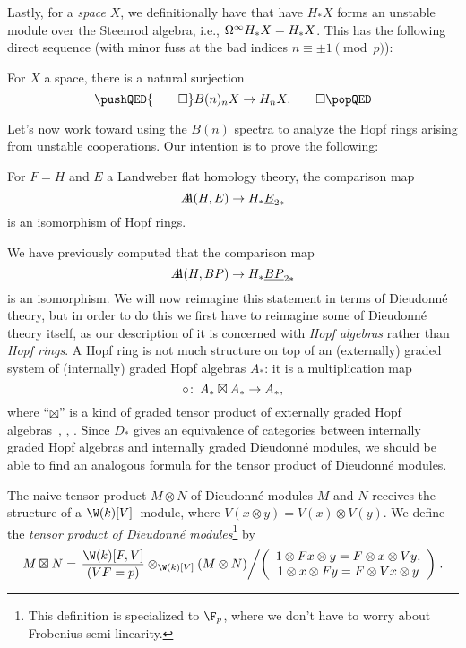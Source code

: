 Lastly, for a \emph{space} $X$, we definitionally have that have $H_* X$ forms an unstable module over the Steenrod algebra, i.e., $\Omega^\infty H_* X = H_* X$.  This has the following direct sequence (with minor fuss at the bad indices $n \equiv \pm 1 \pmod p$):

\begin{lemma}
For $X$ a space, there is a natural surjection
\[\pushQED{\qed}
B(n)_n X \to H_n X. \qedhere
\popQED\]
\end{lemma}



Let's now work toward using the $B(n)$ spectra to analyze the Hopf rings arising from unstable cooperations.  Our intention is to prove the following:
\begin{theorem}
For $F = H$ and $E$ a Landweber flat homology theory, the comparison map \[A\!\!\!A(H, E) \to H_* \underline{\smash{E}}_{2*}\] is an isomorphism of Hopf rings.
\end{theorem}
\noindent We have previously computed that the comparison map \[A\!\!\!A(H, BP) \to H_* \underline{\smash{BP}}_{2*}\] is an isomorphism.  We will now reimagine this statement in terms of Dieudonn\'e theory, but in order to do this we first have to reimagine some of Dieudonn\'e theory itself, as our description of it is concerned with \emph{Hopf algebras} rather than \emph{Hopf rings}.  A Hopf ring is not much structure on top of an (externally) graded system of (internally) graded Hopf algebras $A_*$: it is a multiplication map \[\circ\colon\thinspace A_* \boxtimes A_* \to A_*,\] where ``$\boxtimes$'' is a kind of graded tensor product of externally graded Hopf algebras~\cite[Proposition 2.6]{HuntonTurner}, \cite[Definition 2.2]{BuchstaberLazarev}, \cite[Section 5]{GoerssDieudonne}.  Since $D_*$ gives an equivalence of categories between internally graded Hopf algebras and internally graded Dieudonn\'e modules, we should be able to find an analogous formula for the tensor product of Dieudonn\'e modules.

\begin{definition}{\cite[pg.\ 154]{GoerssDieudonne}}
The naive tensor product $M \otimes N$ of Dieudonn\'e modules $M$ and $N$ receives the structure of a $\W(k)[V]$--module, where $V(x \otimes y) = V(x) \otimes V(y)$.  We define the \textit{tensor product of Dieudonn\'e modules}\footnote{This definition is specialized to $\F_p$, where we don't have to worry about Frobenius semi-linearity.} by \[M \boxtimes N = \left.\frac{\W(k)[F, V]}{(VF = p)} \otimes_{\W(k)[V]} (M \otimes N) \middle/ \left( \begin{array}{c} 1 \otimes Fx \otimes y = F \otimes x \otimes Vy, \\ 1 \otimes x \otimes Fy = F \otimes Vx \otimes y \end{array} \right) \right. .\]
\end{definition}


